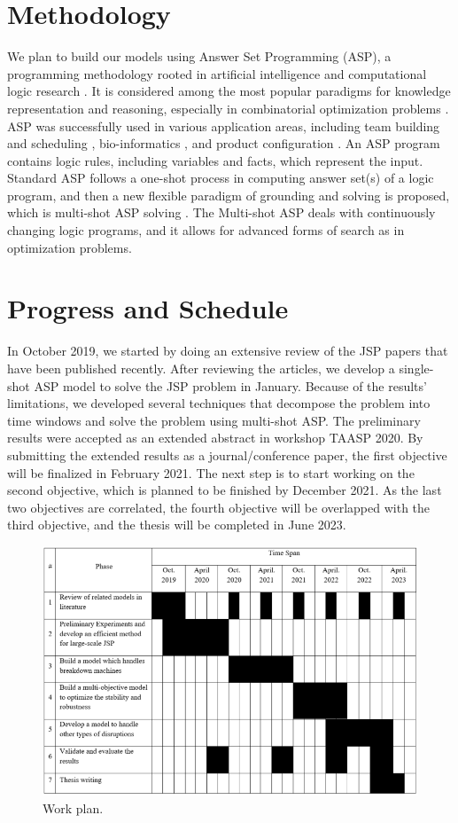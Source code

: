 \documentclass{article}
\begin{document}
\section{Methodology}
We plan to build our models using Answer Set Programming (ASP), a programming methodology rooted in artificial intelligence and computational logic research \cite{lifschitz2002answer}. It is considered among the most popular paradigms for knowledge representation and reasoning, especially in combinatorial optimization problems \cite{abseher2016shift}. ASP was successfully used in various application areas, including team building and scheduling \cite{ricca2011team}, bio-informatics \cite{guziolowski2013exhaustively}, and product configuration \cite{soininen1999developing}. An ASP program contains logic rules, including variables and facts, which represent the input. Standard ASP follows a one-shot process in computing answer set(s) of a logic program, and then a new flexible paradigm of grounding and solving is proposed, which is multi-shot ASP solving \cite{gebser2019multi}. The Multi-shot ASP deals with continuously changing logic programs, and it allows for advanced forms of search as in optimization problems.\\

\section{Progress and Schedule}
In October 2019, we started by doing an extensive review of the JSP papers that have been published recently. After reviewing the articles, we develop a single-shot ASP model to solve the JSP problem in January. Because of the results' limitations, we developed several techniques that decompose the problem into time windows and solve the problem using multi-shot ASP. The preliminary results were accepted as an extended abstract in workshop TAASP 2020. By submitting the extended results as a journal/conference paper, the first objective will be finalized in February 2021. The next step is to start working on the second objective, which is planned to be finished by December 2021. As the last two objectives are correlated, the fourth objective will be overlapped with the third objective, and the thesis will be completed in June 2023. \\

\begin{figure}[h!]
  \includegraphics[width=\linewidth]{Plan2.png}
  \caption{Work plan.}
  \label{fig:Work plan}
\end{figure}



\end{document}
